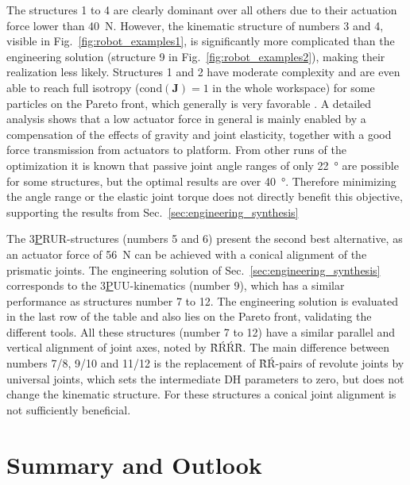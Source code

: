 \documentclass{svproc}
\newcommand{\bm}[1]{\boldsymbol{#1}}
\begin{document}
The structures 1 to 4 are clearly dominant over all others due to their actuation force lower than \SI{40}{\newton}. 
However, the kinematic structure of numbers 3 and 4, visible in Fig.~\ref{fig:robot_examples1}, is significantly more complicated than the engineering solution (structure 9 in  Fig.~\ref{fig:robot_examples2}), making their realization less likely.
Structures 1 and 2 have moderate complexity and are even able to reach full isotropy ($\mathrm{cond}(\bm{J})=1$ in the whole workspace) for some particles on the Pareto front, which generally is very favorable \cite{Gogu2008}.
A detailed analysis shows that a low actuator force in general is mainly enabled by a compensation of the effects of gravity and joint elasticity, together with a good force transmission from actuators to platform.
From other runs of the optimization it is known that passive joint angle ranges of only \SI{22}{\degree} are possible for some structures, but the optimal results are over \SI{40}{\degree}.
Therefore minimizing the angle range or the elastic joint torque does not directly benefit this objective, supporting the results from Sec.~\ref{sec:engineering_synthesis}

The 3\underline{P}RUR-structures (numbers 5 and 6) present the second best alternative, as an actuator force of \SI{56}{\newton} can be achieved with a conical alignment of the prismatic joints.
The engineering solution of Sec.~\ref{sec:engineering_synthesis} corresponds to the 3\underline{P}UU-kinematics (number 9), which has a similar performance as structures number 7 to 12.
The engineering solution is evaluated in the last row of the table and also lies on the Pareto front, validating the different tools.
All these structures (number 7 to 12) have a similar parallel and vertical alignment of joint axes, noted by \`R\'R\'R\`R.
The main difference between numbers 7/8, 9/10 and 11/12 is the replacement of \`R\'R-pairs of revolute joints by universal joints, which sets the intermediate DH parameters to zero, but does not change the kinematic structure.
For these structures a conical joint alignment is not sufficiently beneficial.

\section{Summary and Outlook}
\label{sec:summary}
\end{document}
